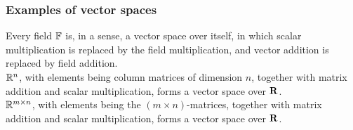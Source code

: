     \subsubsection{Examples of vector spaces}
        Every field $\mathbb{F}$ is, in a sense, a vector space over itself, in which scalar multiplication is replaced by the field multiplication, and vector addition is replaced by field addition. \\

        $\mathbb{R}^n$, with elements being column matrices of dimension $n$, together with matrix addition and scalar multiplication, forms a vector space over $\vb{R}$. \\

        $\mathbb{R}^{m \times n}$, with elements being the $(m \times n)$-matrices, together with matrix addition and scalar multiplication, forms a vector space over $\vb{R}$. \\
